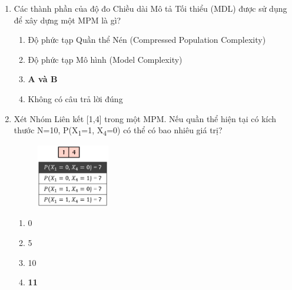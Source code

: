 \documentclass{book}
\begin{document}
\begin{enumerate}
    \item Các thành phần của độ đo Chiều dài Mô tả Tối thiểu (MDL) được sử dụng để xây dựng một MPM là gì?
    \begin{multicols}{2}
        \begin{enumerate}[label=\Alph*]
            \item Độ phức tạp Quần thể Nén (Compressed Population Complexity)
            \item Độ phức tạp Mô hình (Model Complexity)
            \item \textbf{A và B}
            \item Không có câu trả lời đúng
        \end{enumerate}
    \end{multicols}
    
    \item Xét Nhóm Liên kết [1,4] trong một MPM. Nếu quần thể hiện tại có kích thước N=10, P(X\textsubscript{1}=1, X\textsubscript{4}=0) có thể có bao nhiêu giá trị?
    \begin{figure}[H]
        \centering
        \includegraphics[width=0.3\textwidth]{images/quiz5_6.png}
    \end{figure}
    \begin{multicols}{2}
        \begin{enumerate}[label=\Alph*]
            \item 0
            \item 5
            \item 10
            \item \textbf{11}
        \end{enumerate}
    \end{multicols}


\end{enumerate}
\end{document}
